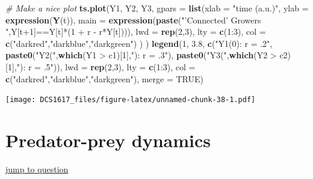 \documentclass[]{book}
\newenvironment{Shaded}{\begin{snugshade}}{\end{snugshade}}
\newcommand{\KeywordTok}[1]{\textcolor[rgb]{0.13,0.29,0.53}{\textbf{{#1}}}}
\newcommand{\DataTypeTok}[1]{\textcolor[rgb]{0.13,0.29,0.53}{{#1}}}
\newcommand{\DecValTok}[1]{\textcolor[rgb]{0.00,0.00,0.81}{{#1}}}
\newcommand{\FloatTok}[1]{\textcolor[rgb]{0.00,0.00,0.81}{{#1}}}
\newcommand{\StringTok}[1]{\textcolor[rgb]{0.31,0.60,0.02}{{#1}}}
\newcommand{\CommentTok}[1]{\textcolor[rgb]{0.56,0.35,0.01}{\textit{{#1}}}}
\newcommand{\OtherTok}[1]{\textcolor[rgb]{0.56,0.35,0.01}{{#1}}}
\newcommand{\NormalTok}[1]{{#1}}
\let\stdsection\section
\renewcommand\section{\newpage\stdsection}
\begin{document}
\begin{Shaded}
\begin{Highlighting}[]
\CommentTok{# Make a nice plot}
\KeywordTok{ts.plot}\NormalTok{(Y1, Y2, Y3,}
        \DataTypeTok{gpars =} \KeywordTok{list}\NormalTok{(}\DataTypeTok{xlab =} \StringTok{"time (a.u.)"}\NormalTok{,}
                     \DataTypeTok{ylab =} \KeywordTok{expression}\NormalTok{(}\KeywordTok{Y}\NormalTok{(t)),}
                     \DataTypeTok{main =} \KeywordTok{expression}\NormalTok{(}\KeywordTok{paste}\NormalTok{(}\StringTok{"'Connected' Growers "}\NormalTok{,Y[t}\DecValTok{+1}\NormalTok{]==Y[t]*(}\DecValTok{1} \NormalTok{+}\StringTok{ }\NormalTok{r -}\StringTok{ }\NormalTok{r*Y[t]))),}
                     \DataTypeTok{lwd =} \KeywordTok{rep}\NormalTok{(}\DecValTok{2}\NormalTok{,}\DecValTok{3}\NormalTok{),}
                     \DataTypeTok{lty =} \KeywordTok{c}\NormalTok{(}\DecValTok{1}\NormalTok{:}\DecValTok{3}\NormalTok{),}
                     \DataTypeTok{col =} \KeywordTok{c}\NormalTok{(}\StringTok{"darkred"}\NormalTok{,}\StringTok{"darkblue"}\NormalTok{,}\StringTok{"darkgreen"}\NormalTok{)}
                     \NormalTok{)}
        \NormalTok{)}
\KeywordTok{legend}\NormalTok{(}\DecValTok{1}\NormalTok{, }\FloatTok{3.8}\NormalTok{, }\KeywordTok{c}\NormalTok{(}\StringTok{"Y1(0):  r = .2"}\NormalTok{,}
                 \KeywordTok{paste0}\NormalTok{(}\StringTok{"Y2("}\NormalTok{,}\KeywordTok{which}\NormalTok{(Y1 >}\StringTok{ }\NormalTok{c1)[}\DecValTok{1}\NormalTok{],}\StringTok{"): r = .3"}\NormalTok{), }
                 \KeywordTok{paste0}\NormalTok{(}\StringTok{"Y3("}\NormalTok{,}\KeywordTok{which}\NormalTok{(Y2 >}\StringTok{ }\NormalTok{c2)[}\DecValTok{1}\NormalTok{],}\StringTok{"): r = .5"}\NormalTok{)),}
       \DataTypeTok{lwd =} \KeywordTok{rep}\NormalTok{(}\DecValTok{2}\NormalTok{,}\DecValTok{3}\NormalTok{), }\DataTypeTok{lty =} \KeywordTok{c}\NormalTok{(}\DecValTok{1}\NormalTok{:}\DecValTok{3}\NormalTok{), }\DataTypeTok{col =} \KeywordTok{c}\NormalTok{(}\StringTok{"darkred"}\NormalTok{,}\StringTok{"darkblue"}\NormalTok{,}\StringTok{"darkgreen"}\NormalTok{), }\DataTypeTok{merge =} \OtherTok{TRUE}\NormalTok{)}
\end{Highlighting}
\end{Shaded}

\texttt{[image: DCS1617\_files/figure-latex/unnamed-chunk-38-1.pdf]}

\hypertarget{ppdsol}{\section{Predator-prey dynamics}\label{ppdsol}}

\href{\%7B\#moc1R\%7D}{\textbar{} jump to question \textbar{}}
\end{document}
